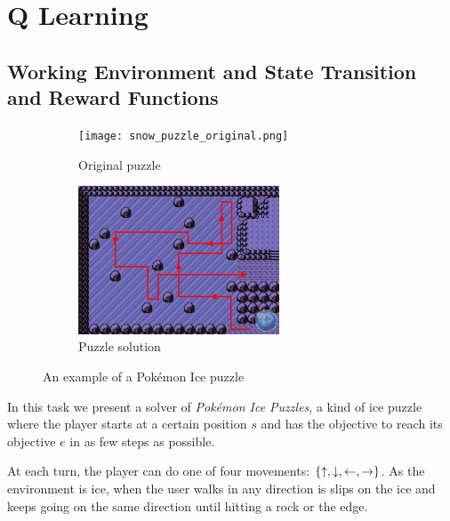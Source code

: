 \renewcommand{\thesection}{Basic Task}

\newcommand{\upa}{\mathlarger{\uparrow}}
\newcommand{\downa}{\mathlarger{\downarrow}}
\newcommand{\lefta}{\mathlarger{\leftarrow}}
\newcommand{\righta}{\mathlarger{\rightarrow}}

\section{Q Learning}

\subsection{Working Environment and State Transition and Reward Functions}

\begin{figure}[h]
	\begin{subfigure}{.49\textwidth}
		\centering
		\texttt{[image: snow\_puzzle\_original.png]}
		\caption{Original puzzle}
	\end{subfigure}
	\begin{subfigure}{.49\textwidth}
		\centering
		\includegraphics[height=125pt]{snow_2.png}
		\caption{Puzzle solution}
	\end{subfigure}
	\caption{An example of a Pokémon Ice puzzle}
\end{figure}

In this task we present a solver of \emph{Pokémon Ice Puzzles}, a kind of ice puzzle where the player starts at a certain position $s$ and has the objective to reach its objective $e$ in as few steps as possible.

At each turn, the player can do one of four movements: $\{\upa, \downa, \lefta, \righta\}$.
As the environment is ice, when the user walks in any direction is slips on the ice and keeps going on the same direction until hitting a rock or the edge.

